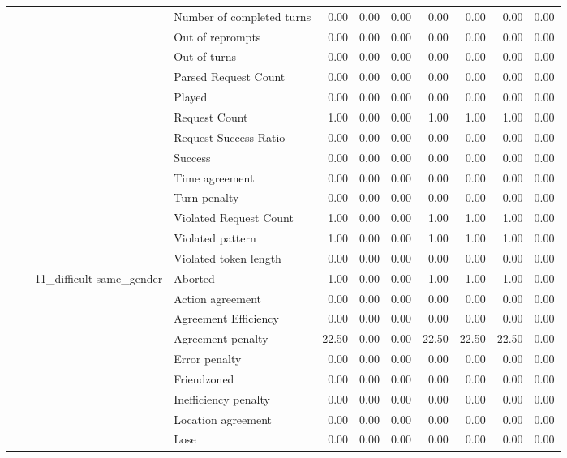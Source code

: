 \begin{tabular}{llllrrrrrrr}
 &  &  & Number of completed turns & 0.00 & 0.00 & 0.00 & 0.00 & 0.00 & 0.00 & 0.00 \\
 &  &  & Out of reprompts & 0.00 & 0.00 & 0.00 & 0.00 & 0.00 & 0.00 & 0.00 \\
 &  &  & Out of turns & 0.00 & 0.00 & 0.00 & 0.00 & 0.00 & 0.00 & 0.00 \\
 &  &  & Parsed Request Count & 0.00 & 0.00 & 0.00 & 0.00 & 0.00 & 0.00 & 0.00 \\
 &  &  & Played & 0.00 & 0.00 & 0.00 & 0.00 & 0.00 & 0.00 & 0.00 \\
 &  &  & Request Count & 1.00 & 0.00 & 0.00 & 1.00 & 1.00 & 1.00 & 0.00 \\
 &  &  & Request Success Ratio & 0.00 & 0.00 & 0.00 & 0.00 & 0.00 & 0.00 & 0.00 \\
 &  &  & Success & 0.00 & 0.00 & 0.00 & 0.00 & 0.00 & 0.00 & 0.00 \\
 &  &  & Time agreement & 0.00 & 0.00 & 0.00 & 0.00 & 0.00 & 0.00 & 0.00 \\
 &  &  & Turn penalty & 0.00 & 0.00 & 0.00 & 0.00 & 0.00 & 0.00 & 0.00 \\
 &  &  & Violated Request Count & 1.00 & 0.00 & 0.00 & 1.00 & 1.00 & 1.00 & 0.00 \\
 &  &  & Violated pattern & 1.00 & 0.00 & 0.00 & 1.00 & 1.00 & 1.00 & 0.00 \\
 &  &  & Violated token length & 0.00 & 0.00 & 0.00 & 0.00 & 0.00 & 0.00 & 0.00 \\
\cline{3-11}
 &  & \multirow[t]{27}{*}{11_difficult-same_gender} & Aborted & 1.00 & 0.00 & 0.00 & 1.00 & 1.00 & 1.00 & 0.00 \\
 &  &  & Action agreement & 0.00 & 0.00 & 0.00 & 0.00 & 0.00 & 0.00 & 0.00 \\
 &  &  & Agreement Efficiency & 0.00 & 0.00 & 0.00 & 0.00 & 0.00 & 0.00 & 0.00 \\
 &  &  & Agreement penalty & 22.50 & 0.00 & 0.00 & 22.50 & 22.50 & 22.50 & 0.00 \\
 &  &  & Error penalty & 0.00 & 0.00 & 0.00 & 0.00 & 0.00 & 0.00 & 0.00 \\
 &  &  & Friendzoned & 0.00 & 0.00 & 0.00 & 0.00 & 0.00 & 0.00 & 0.00 \\
 &  &  & Inefficiency penalty & 0.00 & 0.00 & 0.00 & 0.00 & 0.00 & 0.00 & 0.00 \\
 &  &  & Location agreement & 0.00 & 0.00 & 0.00 & 0.00 & 0.00 & 0.00 & 0.00 \\
 &  &  & Lose & 0.00 & 0.00 & 0.00 & 0.00 & 0.00 & 0.00 & 0.00 \\

\end{tabular}
